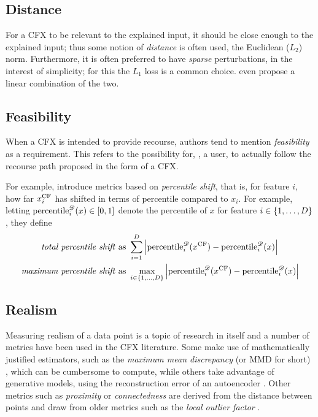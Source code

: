 \documentclass[../main.tex]{subfiles}
\begin{document}
\subsection{Distance}

For a CFX to be relevant to the explained input, it should be close enough to the explained input; thus some notion of \emph{distance} is often used, \eg{} the Euclidean ($L_2$) norm.
Furthermore, it is often preferred to have \emph{sparse} perturbations, in the interest of simplicity; for this the $L_1$ loss is a common choice. \citenote{}
\citeauthor{vanlooverenInterpretable2021} even propose a linear combination of the two.

\subsection{Feasibility}

When a CFX is intended to provide recourse, authors tend to mention \emph{feasibility} as a requirement.
This refers to the possibility for, \eg{}, a user, to actually follow the recourse path proposed in the form of a CFX.

For example, \citeauthor{pawelczykLearning2020} introduce metrics based on \emph{percentile shift}, that is, for feature $i$, how far $x^\mathrm{CF}_i$ has shifted in terms of percentile compared to $x_i$.
For example, letting $\text{percentile}_i^{\mathscr{D}}(x) \in [0, 1]$ denote the percentile of $x$ for feature $i \in \{1, \ldots, D\}$, they define
\begin{align*}
    \text{\emph{total percentile shift} as }   & \sum_{i=1}^D \left\lvert \text{percentile}_i^{\mathscr{D}}(x^\mathrm{CF}) - \text{percentile}_i^{\mathscr{D}}(x) \right\rvert                  \\
    \text{\emph{maximum percentile shift} as } & \max_{i \in \{1, \ldots, D\}} \left\lvert \text{percentile}_i^{\mathscr{D}}(x^\mathrm{CF}) - \text{percentile}_i^{\mathscr{D}}(x) \right\rvert
\end{align*}


\subsection{Realism}

Measuring realism of a data point is a topic of research in itself and a number of metrics have been used in the CFX literature.
Some make use of mathematically justified estimators, such as the \emph{maximum mean discrepancy} (or MMD for short) \cite{zhangInterpretable2022}, which can be cumbersome to compute, while others take advantage of generative models, \eg{} using the reconstruction error of an autoencoder \cite{vanlooverenInterpretable2021}.
Other metrics such as \emph{proximity} or \emph{connectedness} \cite{laugelIssues2019} are derived from the distance between points and draw from older metrics such as the \emph{local outlier factor} \cite{breunigLOF2000}.
\end{document}
